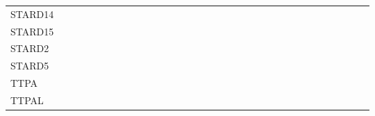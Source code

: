 \begin{tabular}{lllllllllllllllllllllllllllllllll}
STARD14 &  &  &  &  &  &  &  &  &  &  &  &  &  &  &  &  &  &  &  &  &  &  &  &  &  &  &  &  &  &  &  & \\
STARD15 &  &  &  &  &  &  &  &  &  &  &  &  &  &  &  &  &  &  &  &  &  &  &  &  &  &  &  &  &  &  &  & \\
STARD2 &  &  &  &  &  &  &  &  &  &  &  &  &  &  &  &  &  &  & \cellcolor{emblgreen!75} &  &  &  &  &  &  &  &  &  &  &  &  & \\
STARD5 & \cellcolor{emblgreen!75} & \cellcolor{emblgreen!75} & \cellcolor{emblgreen!75} &  &  &  &  &  &  &  & \cellcolor{emblgreen!75} &  &  &  &  &  &  &  &  &  &  &  &  &  &  &  &  &  &  &  &  & \\
TTPA &  &  &  &  &  &  &  &  &  &  &  &  &  &  &  &  &  &  &  &  &  &  &  & \cellcolor{emblgreen!75} &  &  &  &  &  &  & \cellcolor{emblgreen!75} & \\
TTPAL &  &  &  &  &  &  &  &  &  &  &  &  &  &  &  &  &  &  &  &  &  &  &  &  &  &  &  &  &  &  &  &  \\
        \end{tabular}